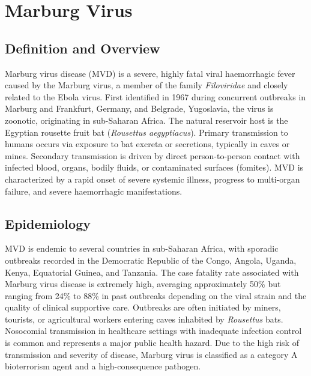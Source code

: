 \chapter{Marburg Virus}

\section*{Definition and Overview}
Marburg virus disease (MVD) is a severe, highly fatal viral haemorrhagic fever caused by the Marburg virus, a member of the family \textit{Filoviridae} and closely related to the Ebola virus. First identified in 1967 during concurrent outbreaks in Marburg and Frankfurt, Germany, and Belgrade, Yugoslavia, the virus is zoonotic, originating in sub-Saharan Africa. The natural reservoir host is the Egyptian rousette fruit bat (\textit{Rousettus aegyptiacus}). Primary transmission to humans occurs via exposure to bat excreta or secretions, typically in caves or mines. Secondary transmission is driven by direct person-to-person contact with infected blood, organs, bodily fluids, or contaminated surfaces (fomites). MVD is characterized by a rapid onset of severe systemic illness, progress to multi-organ failure, and severe haemorrhagic manifestations.

\section*{Epidemiology}
MVD is endemic to several countries in sub-Saharan Africa, with sporadic outbreaks recorded in the Democratic Republic of the Congo, Angola, Uganda, Kenya, Equatorial Guinea, and Tanzania. The case fatality rate associated with Marburg virus disease is extremely high, averaging approximately 50\% but ranging from 24\% to 88\% in past outbreaks depending on the viral strain and the quality of clinical supportive care. Outbreaks are often initiated by miners, tourists, or agricultural workers entering caves inhabited by \textit{Rousettus} bats. Nosocomial transmission in healthcare settings with inadequate infection control is common and represents a major public health hazard. Due to the high risk of transmission and severity of disease, Marburg virus is classified as a category A bioterrorism agent and a high-consequence pathogen.

